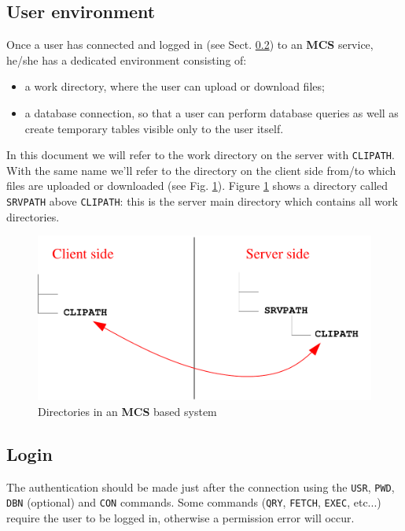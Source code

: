 \documentclass[12pt,titlepage]{article}
\newcommand{\mcs}{\textbf{MCS} }
\begin{document}
\subsection{User environment}
Once a user has connected and logged in (see Sect. \ref{sec:login}) to
an \mcs service, he/she has a dedicated environment consisting of:
\begin{itemize}
\item a work directory, where the user can upload or download files;
\item a database connection, so that a user can perform database
queries as well as create temporary tables visible only to the user
itself.
\end{itemize}

In this document we will refer to the work directory on the server
with \verb|CLIPATH|. With the same name we'll refer to the directory
on the client side from/to which files are uploaded or downloaded (see
Fig. \ref{fig:dirs}). Figure \ref{fig:dirs} shows a directory called
\verb|SRVPATH| above \verb|CLIPATH|: this is the server main directory
which contains all work directories.
%
%
\begin{figure}[hbtp]
\begin{center}
\includegraphics[width=14cm,keepaspectratio]{includes/dirs}
\end{center}
\caption{Directories in an \mcs based system}
\label{fig:dirs}
\end{figure}

%
%
\subsection{Login}\label{sec:login}
The authentication should be made just after the connection using the
\verb|USR|, \verb|PWD|, \verb|DBN| (optional) and \verb|CON| commands.
Some commands (\verb|QRY|, \verb|FETCH|, \verb|EXEC|, etc...) require
the user to be logged in, otherwise a permission error will occur.
\end{document}
